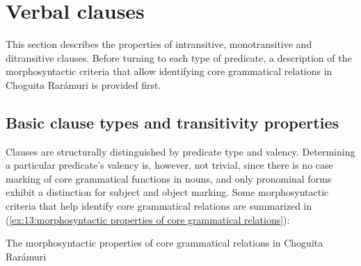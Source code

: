 \section{Verbal clauses}
\label{sec: verbal predicates}

This section describes the properties of intransitive, monotransitive and ditransitive clauses. Before turning to each type of predicate, a description of the morphosyntactic criteria that allow identifying core grammatical relations in Choguita Rarámuri is provided first.

\subsection{Basic clause types and transitivity properties}
\label{subsec: basic clause types and transitivity properties}

Clauses are structurally distinguished by predicate type and valency. Determining a particular predicate's valency is, however, not trivial, since there is no case marking of core grammatical functions in nouns, and only pronominal forms exhibit a distinction for subject and object marking. Some morphosyntactic criteria that help identify core grammatical relations are summarized in (\ref{ex:13:morphosyntactic properties of core grammatical relations}):

\ea\label{ex:13:morphosyntactic properties of core grammatical relations}
{The morphosyntactic properties of core grammatical relations in Choguita Rarámuri}\\

